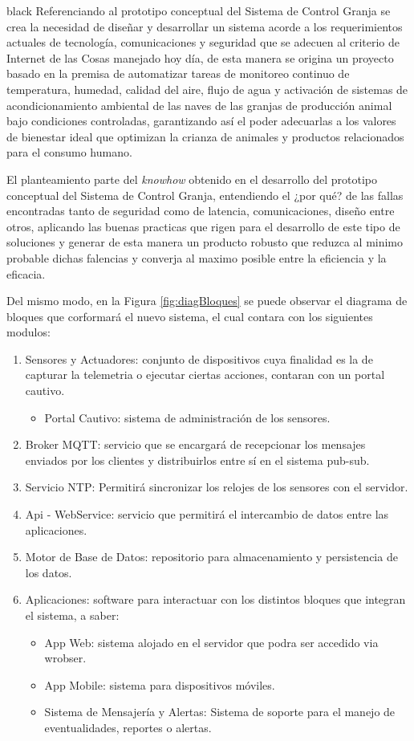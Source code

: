 \documentclass[11pt]{charter}
\begin{document}
\begin{consigna}{black} 
Referenciando al prototipo conceptual del Sistema de Control Granja se crea la necesidad de diseñar y desarrollar un sistema acorde a los requerimientos actuales de tecnología, comunicaciones y seguridad que se adecuen al criterio de Internet de las Cosas manejado hoy día, de esta manera se origina un proyecto basado en la premisa de automatizar tareas de monitoreo continuo de temperatura, humedad, calidad del aire, flujo de agua y activación de sistemas de acondicionamiento ambiental de las naves de las granjas de producción animal bajo condiciones controladas, garantizando así el poder adecuarlas a los valores de bienestar ideal que optimizan la crianza de animales y productos relacionados para el consumo humano. 

El planteamiento parte del \textit{knowhow} obtenido en el desarrollo del prototipo conceptual del Sistema de Control Granja, entendiendo el ¿por qué? de las fallas encontradas tanto de seguridad como de latencia, comunicaciones, diseño entre otros, aplicando las buenas practicas que rigen para el desarrollo de este tipo de soluciones y generar de esta manera un producto robusto que reduzca al minimo probable dichas falencias y converja al maximo posible entre la eficiencia y la eficacia.

Del mismo modo, en la Figura \ref{fig:diagBloques} se puede observar el diagrama de bloques que corformará el nuevo sistema, el cual contara con los siguientes modulos: 
\begin{enumerate}
\item Sensores y Actuadores: conjunto de dispositivos cuya finalidad es la de capturar la telemetria o ejecutar ciertas acciones, contaran con un portal cautivo.
\begin{itemize}
\item Portal Cautivo: sistema de administración de los sensores.
\end{itemize}
\item Broker MQTT: servicio que se encargará de recepcionar los mensajes enviados por los clientes y distribuirlos entre sí en el sistema pub-sub.
\item Servicio NTP: Permitirá sincronizar los relojes de los sensores con el servidor.
\item Api - WebService: servicio que permitirá el intercambio de datos entre las aplicaciones.
\item Motor de Base de Datos: repositorio para almacenamiento y persistencia de los datos.
\item Aplicaciones: software para interactuar con los distintos bloques que integran el sistema, a saber:
	\begin{itemize}
		\item App Web: sistema alojado en el servidor que podra ser accedido via wrobser.
		\item App Mobile: sistema para dispositivos móviles.
		\item Sistema de Mensajería y Alertas: Sistema de soporte para el manejo de eventualidades, reportes o alertas.
	\end{itemize}
\end{enumerate}


\end{consigna}
\end{document}
